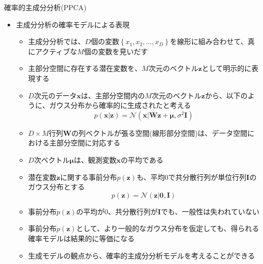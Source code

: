 \documentclass[dvipdfmx,notheorems,t]{beamer}
\begin{document}
\begin{frame}{確率的主成分分析(PPCA)}

\begin{itemize}
	\item 主成分分析の確率モデルによる表現
	\begin{itemize}
		\item 主成分分析では、$D$個の変数$\left\{ x_1, x_2, \ldots, x_D \right\}$を線形に組み合わせて、\alert{真にアクティブな$M$個の変数}を見いだす
		\newline
		
		\item 主部分空間に存在する潜在変数を、$M$次元のベクトル$\bm{z}$として明示的に表現する
		\item $D$次元のデータ$\bm{x}$は、主部分空間内の$M$次元のベクトル$\bm{z}$から、以下のように、ガウス分布から\alert{確率的に}生成されたと考える
		\begin{equation}
			p(\bm{x} | \bm{z}) = \mathcal{N}(\bm{x} | \bm{W} \bm{z} + \bm{\mu}, \sigma^2 \bm{I})
		\end{equation}
		
		\item $D \times M$行列$\bm{W}$の列ベクトルが張る空間(線形部分空間)は、データ空間における\alert{主部分空間に対応}する
		\item $D$次ベクトル$\bm{\mu}$は、観測変数$\bm{x}$の平均である
		\newline
		
		\item 潜在変数$\bm{z}$に関する事前分布$p(\bm{z})$も、平均$0$で共分散行列が単位行列$\bm{I}$のガウス分布とする
		\begin{equation}
			p(\bm{z}) = \mathcal{N}(\bm{z} | \bm{0}, \bm{I})
		\end{equation}
		
		\item 事前分布$p(\bm{z})$の平均が$0$、共分散行列が$\bm{I}$でも、一般性は失われていない
		\item 事前分布$p(\bm{z})$として、より一般的なガウス分布を仮定しても、得られる確率モデルは結果的に等価になる
		\newline
		
		\item \alert{生成モデル}の観点から、確率的主成分分析モデルを考えることができる
	\end{itemize}
\end{itemize}

\end{frame}
\end{document}
